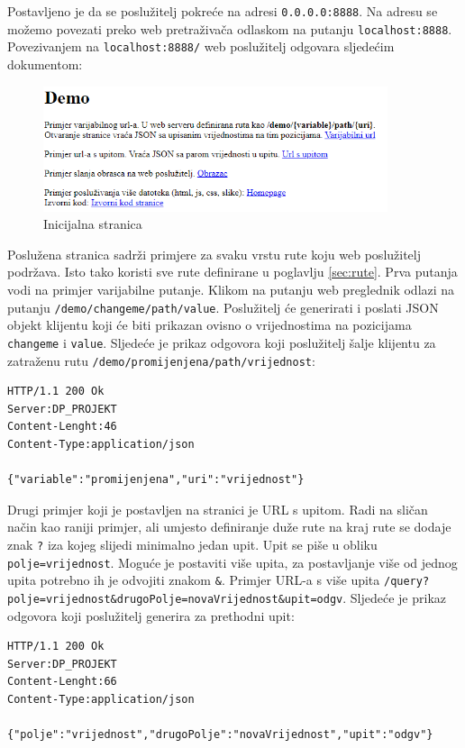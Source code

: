 \documentclass[]{foi} %
\begin{document}
Postavljeno je da se poslužitelj pokreće na adresi \texttt{0.0.0.0:8888}. Na adresu se
možemo povezati preko web pretraživača odlaskom na putanju \texttt{localhost:8888}.
Povezivanjem na \texttt{localhost:8888/} web poslužitelj odgovara sljedećim dokumentom:
\begin{figure}[h!]
    \centering
    \includegraphics[width=0.9\textwidth]{slike/demo.png}
    \caption{Inicijalna stranica}
    \label{fig:init}
\end{figure}

Poslužena stranica sadrži primjere za svaku vrstu rute koju web poslužitelj podržava. Isto
tako koristi sve rute definirane u poglavlju \ref{sec:rute}. Prva putanja vodi na primjer
varijabilne putanje. Klikom na putanju web preglednik odlazi na putanju 
\texttt{/demo/changeme/path/value}. Poslužitelj će generirati i poslati JSON objekt
klijentu koji će biti prikazan ovisno o vrijednostima na pozicijama \texttt{changeme} i
\texttt{value}. Sljedeće je prikaz odgovora koji poslužitelj šalje klijentu za
zatraženu rutu \texttt{/demo/promijenjena/path/vrijednost}:

\begin{verbatim}
HTTP/1.1 200 Ok
Server:DP_PROJEKT
Content-Lenght:46
Content-Type:application/json

{"variable":"promijenjena","uri":"vrijednost"}
\end{verbatim}

Drugi primjer koji je postavljen na stranici je URL s upitom. Radi na sličan način kao
raniji primjer, ali umjesto definiranje duže rute na kraj rute se dodaje znak \texttt{?}
iza kojeg slijedi minimalno jedan upit. Upit se piše u obliku \texttt{polje=vrijednost}.
Moguće je postaviti više upita, za postavljanje više od jednog upita potrebno ih je odvojiti
znakom \texttt{\&}. Primjer URL-a s više upita 
\texttt{/query?polje=vrijednost\&drugoPolje=novaVrijednost\&upit=odgv}.
Sljedeće je prikaz odgovora koji poslužitelj generira za prethodni upit: 
\begin{verbatim}
HTTP/1.1 200 Ok
Server:DP_PROJEKT
Content-Lenght:66
Content-Type:application/json

{"polje":"vrijednost","drugoPolje":"novaVrijednost","upit":"odgv"}
\end{verbatim}
\end{document}
